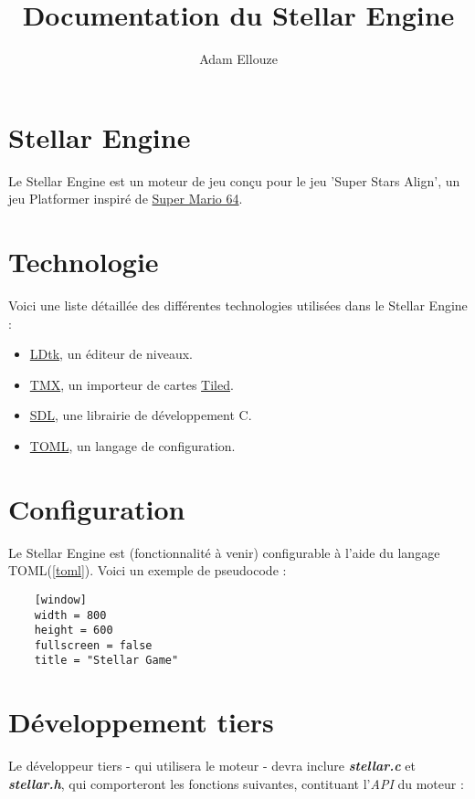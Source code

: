 \documentclass{article}
\title{Documentation du Stellar Engine}
\author{Adam Ellouze}
\numberwithin{equation}{section}    %
\begin{document}

    \maketitle

    \section{Stellar Engine}
    Le Stellar Engine est un moteur de jeu conçu pour le jeu 'Super Stars Align', un jeu Platformer inspiré de \href{https://en.wikipedia.org/wiki/Super_Mario_64}{Super Mario 64}. \vspace{1cm}

    \section{Technologie}
    Voici une liste détaillée des différentes technologies utilisées dans le Stellar Engine :

    \begin{itemize}
        \item \href{https://ldtk.io/}{LDtk}, un éditeur de niveaux.
        \item  \label{maped} \href{https://github.com/baylej/tmx/}{TMX}, un importeur de cartes \href{https://www.mapeditor.org/}{Tiled}.
        \label{sdl} \item \href{https://libsdl.com}{SDL}, une librairie de développement C.
        \item \label{toml}  \href{https://toml.io/en/}{TOML}, un langage de configuration.
    \end{itemize}

    \section{Configuration}
    Le Stellar Engine est (fonctionnalité à venir) configurable à l'aide du langage TOML(\ref{toml}). Voici un exemple de pseudocode :


    \begin{lstlisting}
    [window]
    width = 800
    height = 600
    fullscreen = false
    title = "Stellar Game"
    \end{lstlisting}

    \section{Développement tiers}
    Le développeur tiers - qui utilisera le moteur - devra inclure \textit{\textbf{stellar.c}}  et \textit{\textbf{stellar.h}}, qui comporteront les fonctions suivantes, contituant l'\textit{API} du moteur :
\end{document}
